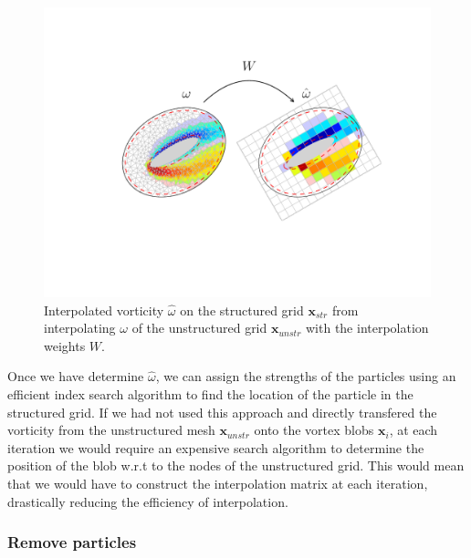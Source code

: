 	\begin{figure}[h]
	\centering
	\includegraphics[trim=4.cm 4cm 2cm 2.5cm, clip, width=0.7\linewidth]{./figures/hybrid/interpolation/ellipse/interpolation_FE2StructuredGrid_withData.pdf}
	\caption{Interpolated vorticity $\hat{\omega}$ on the structured grid $\mathbf{x}_{str}$ from interpolating $\omega$ of the unstructured grid $\mathbf{x}_{unstr}$ with the interpolation weights $W$.}
	\label{fig:interpolation_FE2StructuredGrid_withData}
	\end{figure}

Once we have determine $\hat{\omega}$, we can assign the strengths of the particles using an efficient index search algorithm to find the location of the particle in the structured grid. If we had not used this approach and directly transfered the vorticity from the unstructured mesh $\mathbf{x}_{unstr}$ onto the vortex blobs $\mathbf{x}_i$, at each iteration we would require an expensive search algorithm to determine the position of the blob w.r.t to the nodes of the unstructured grid. This would mean that we would have to construct the interpolation matrix at each iteration, drastically reducing the efficiency of interpolation.

\subsubsection*{Remove particles}

